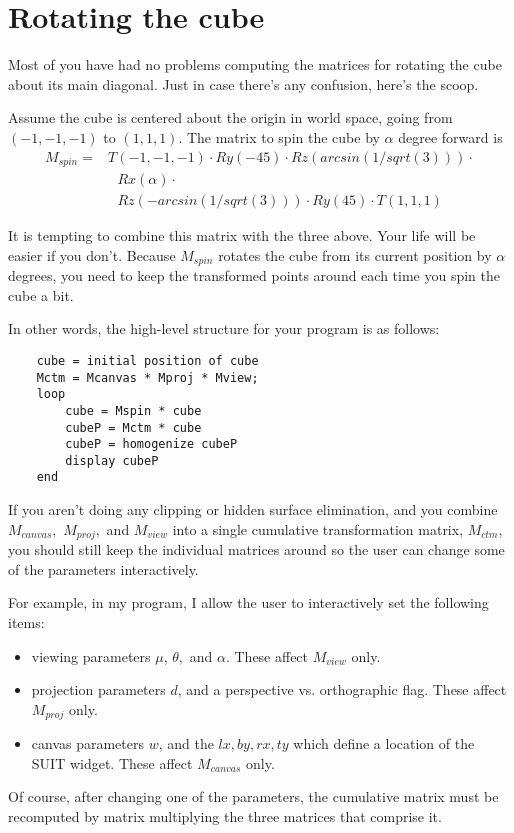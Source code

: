 \section{Rotating the cube}

Most of you have had no problems computing the matrices for
rotating the cube about its main diagonal. Just in case there's any
confusion, here's the scoop.

Assume the cube is centered about the
origin in world space, going from $(-1,-1,-1)$ to $(1,1,1)$. The matrix to spin
the cube by $\alpha$ degree forward is
\begin{eqnarray*}
    M_{spin} =  & T(-1, -1, -1) \cdot Ry(-45) \cdot Rz(arcsin(1/sqrt(3)))
      \cdot  \\
      & ~~~ Rx(\alpha) \cdot \\
      & ~~~ Rz(-arcsin(1/sqrt(3))) \cdot Ry(45) \cdot
       T(1, 1, 1)
\end{eqnarray*}

It is tempting to combine this matrix with the three above. Your life will be
easier if you don't.  Because $M_{spin}$ rotates the cube from its current
position by $\alpha$ degrees, you need to keep the transformed points around
each time you spin the cube a bit.

In other words, the high-level structure for your program is as follows:
\begin{verbatim}
    cube = initial position of cube
    Mctm = Mcanvas * Mproj * Mview;
    loop
        cube = Mspin * cube
        cubeP = Mctm * cube
        cubeP = homogenize cubeP
        display cubeP
    end
\end{verbatim}

If you aren't doing any clipping or hidden surface elimination, and you combine
$M_{canvas},$ $M_{proj},$ and $M_{view}$ into a single cumulative
transformation matrix, $M_{ctm}$, you should still keep the individual matrices
around so the user can change some of the parameters interactively.

For example, in my program, I allow the user to interactively set
the following items:
\begin{itemize}
\item 
viewing parameters $\mu$, $\theta,$ and $\alpha$. These affect
$M_{view}$ only.   
\item 
projection parameters $d$,  and a perspective vs. orthographic flag.
These affect $M_{proj}$ only.
\item 
canvas parameters $w$, and the $lx, by, rx, ty$ which define a
location of the SUIT widget. These affect $M_{canvas}$ only. 
\end{itemize}
Of course, after changing one of the parameters, the cumulative matrix
must be recomputed by matrix multiplying the three matrices that
comprise it.  





